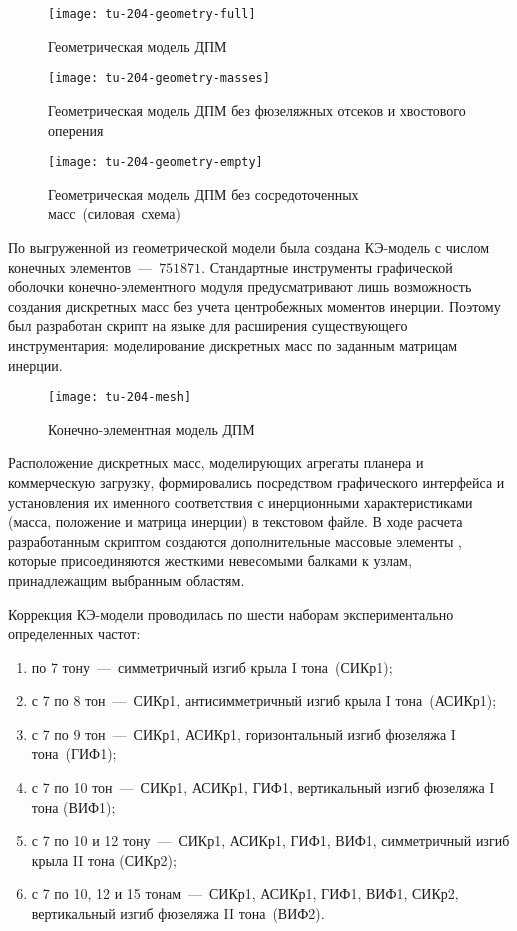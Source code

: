 \begin{figure}[!htb]
	\centerfloat
	\texttt{[image: tu-204-geometry-full]}
	\caption{Геометрическая модель ДПМ} \label{fig:tu-204-geometry-full}
\end{figure}

\begin{figure}[!htb]
	\centerfloat
	\texttt{[image: tu-204-geometry-masses]}
	\caption{Геометрическая модель ДПМ без фюзеляжных отсеков и хвостового оперения} \label{fig:tu-204-geometry-masses}
\end{figure}

\begin{figure}[!htb]
	\centerfloat
	\texttt{[image: tu-204-geometry-empty]}
	\caption{Геометрическая модель ДПМ без сосредоточенных масс~(силовая~схема)} \label{fig:tu-204-geomtery-empty}
\end{figure}

По выгруженной из  геометрической модели была создана КЭ-модель   с числом конечных элементов~---~$ 751871 $. Стандартные инструменты графической оболочки конечно-элементного модуля  предусматривают лишь возможность создания дискретных масс без учета центробежных моментов инерции. Поэтому был разработан скрипт на языке  для расширения существующего инструментария: моделирование дискретных масс по заданным матрицам инерции. 

\begin{figure}[!htb]
	\centerfloat
	\texttt{[image: tu-204-mesh]}
	\caption{Конечно-элементная модель ДПМ} \label{fig:tu-204-mesh}
\end{figure}

Расположение дискретных масс, моделирующих агрегаты планера и коммерческую загрузку, формировались посредством графического интерфейса  и установления их именного соответствия с инерционными характеристиками (масса, положение и матрица инерции) в текстовом файле. В ходе расчета разработанным скриптом создаются дополнительные массовые элементы , которые присоединяются жесткими невесомыми балками к узлам, принадлежащим выбранным областям. 

Коррекция КЭ-модели проводилась по шести наборам экспериментально определенных частот:
\begin{enumerate}
	\item по 7 тону~---~симметричный изгиб крыла I тона~(СИКр1);
	\item с 7 по 8 тон~---~СИКр1, антисимметричный изгиб крыла I тона~(АСИКр1);
	\item с 7 по 9 тон~---~СИКр1, АСИКр1, горизонтальный изгиб фюзеляжа I тона~(ГИФ1);
	\item с 7 по 10 тон~---~СИКр1, АСИКр1, ГИФ1, вертикальный изгиб фюзеляжа I тона (ВИФ1);
	\item с 7 по 10 и 12 тону~---~СИКр1, АСИКр1, ГИФ1, ВИФ1, симметричный изгиб крыла II тона (СИКр2);
	\item с 7 по 10, 12 и 15 тонам~---~СИКр1, АСИКр1, ГИФ1, ВИФ1, СИКр2, вертикальный изгиб фюзеляжа II тона~(ВИФ2).
\end{enumerate}

